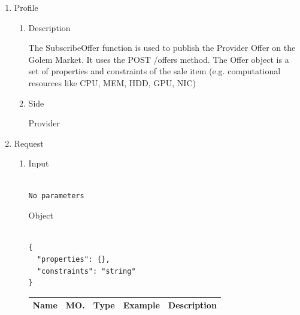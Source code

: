 

\begin{enumerate}

\item Profile

\begin{enumerate}

\item Description

The SubscribeOffer function is used to publish the Provider Offer on the Golem Market. It uses the POST /offers method.
The Offer object is a set of properties and constraints of the sale item (e.g. computational resources like CPU, MEM, HDD, GPU, NIC)

\item Side

Provider

\end{enumerate}

\item Request

\begin{enumerate}

\item Input

\begin{tcolorbox}[boxrule=0pt, frame empty]
\begin{verbatim}

No parameters

\end{verbatim}
\end{tcolorbox}

Object

\begin{tcolorbox}[boxrule=0pt, frame empty]
\begin{verbatim}

{
  "properties": {},
  "constraints": "string"
}

\end{verbatim}
\end{tcolorbox}

\begin{table}[H]
\footnotesize

\begin{center}
\begin{tabular}{|p{3cm}|l|p{3cm}|p{3cm}|p{4cm}|} 
\hline
\rowcolor{lightgray}	Name	& MO.	& Type	& Example & 	Description \\
\hline


\end{tabular}
\end{center}
\end{table}
\end{enumerate}
\end{enumerate}
